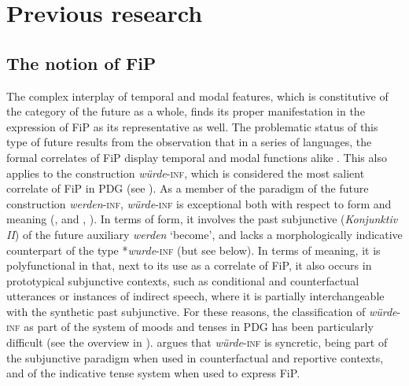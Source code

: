 \documentclass[output=paper,colorlinks,citecolor=brown]{langscibook}
\begin{document}
\section{Previous research} \label{section 2}

\subsection{The notion of FiP} \label{section 2.1}


The complex interplay of temporal and modal features, which is constitutive of the category of the future as a whole, finds its proper manifestation in the expression of FiP as its representative as well. The problematic status of this type of future results from the observation that in a series of languages, the formal correlates of FiP display temporal and modal functions alike \citep[75]{Comrie1985}. This also applies to the construction \textit{würde}-\textsc{inf}, which is considered the most salient correlate of FiP in PDG (see ). As a member of the paradigm of the future construction \textit{werden}-\textsc{inf},  \textit{würde}-\textsc{inf} is exceptional both with respect to form and meaning (\cite{Thieroff1992}, \citeauthor{FabriciusHansen1998} \citeyear{FabriciusHansen1998} and \citeyear{FabriciusHansen2000}, \cite{Smirnova2006}). In terms of form, it involves the past subjunctive (\textit{Konjunktiv II}) of the future auxiliary \textit{werden} ‘become’, and lacks a morphologically indicative counterpart of the type *\textit{wurde}-\textsc{inf} (but see   below). In terms of meaning, it is polyfunctional in that, next to its use as a correlate of FiP, it also occurs in prototypical subjunctive contexts, such as conditional and counterfactual utterances or instances of indirect speech, where it is partially interchangeable with the synthetic past subjunctive. For these reasons, the classification of \textit{würde}-\textsc{inf} as part of the system of moods and tenses in PDG has been particularly difficult (see the overview in \cite[11–40]{Smirnova2006}). \citet[141–159]{Thieroff1992} argues that \textit{würde}-\textsc{inf} is syncretic, being part of the subjunctive paradigm when used in counterfactual and reportive contexts, and of the indicative tense system when used to express FiP.
\end{document}
